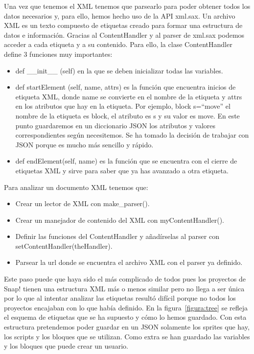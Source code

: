 \documentclass[a4paper, 12pt]{book}
\begin{document}
 Una vez que tenemos el XML tenemos que parsearlo para poder obtener todos los datos necesarios y, para ello, hemos hecho uso de la API xml.sax. Un archivo XML es un texto compuesto de etiquetas creado para formar una estructura de datos e información. Gracias al ContentHandler y al parser de xml.sax podemos acceder a cada etiqueta y a su contenido. Para ello, la clase ContentHandler define 3 funciones muy importantes:
 \begin{itemize}
     \item  def \_\_init\_\_ (self) en la que se deben inicializar todas las variables.
     \item def startElement (self, name, attrs) es la función que encuentra inicios de etiqueta XML, donde name se convierte en el nombre de la etiqueta y attrs en los atributos que hay en la etiqueta. Por ejemplo, block s=``move'' el nombre de la etiqueta es block, el atributo es s y su valor es move. En este punto guardaremos en un diccionario JSON los atributos y valores correspondientes  según necesitemos. Se ha tomado la decisión de trabajar con JSON porque es mucho más sencillo y rápido.
     \item def endElement(self, name) es la función que se encuentra con el cierre de etiquetas XML y sirve para saber que ya  has avanzado a otra etiqueta.

 \end{itemize}
 Para analizar un documento XML tenemos que:
 \begin{itemize}
     \item Crear un lector de XML con make\_parser().
     \item  Crear un manejador de contenido del XML con myContentHandler().
     \item Definir las funciones del ContentHandler y añadírselas al parser con setContentHandler(theHandler).
     \item Parsear la url donde se encuentra el archivo XML con el parser ya definido.
 \end{itemize}
Este paso puede que haya sido el más complicado de todos pues los proyectos de Snap! tienen una estructura XML más o menos similar pero no llega a ser única por lo que al intentar analizar las etiquetas resultó difícil porque no todos los proyectos encajaban con lo que había definido. En la figura~\ref{figura:tree} se refleja el esquema de etiquetas que se ha supuesto y cómo lo hemos guardado. Con esta estructura pretendemos poder guardar en un JSON solamente  los sprites que hay, los scripts y los bloques que se utilizan. Como extra se han guardado las variables y los bloques que puede crear un usuario. \\
\end{document}
